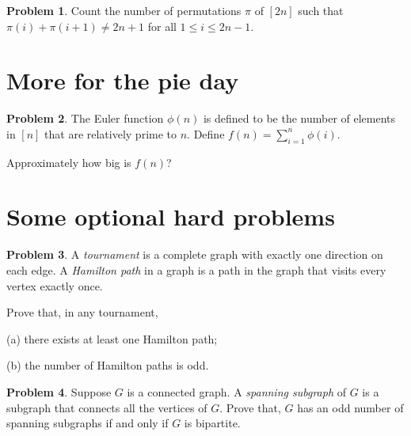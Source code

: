 \documentclass[12pt]{article}
\theoremstyle{definition}
\newtheorem{hw}{Problem}
\begin{document}
\begin{hw}
Count the number of permutations $\pi$ of $[2n]$ such that $\pi(i)+ \pi(i+1) \neq 2n+1$ for all $1 \leq i \leq 2n-1$.
\end{hw}

\section{More for the pie day}

\begin{hw}
The Euler function $\phi(n)$ is defined to be the number of elements
in $[n]$ that are relatively prime to $n$. Define $f(n)= \sum_{i=1}^n
\phi(i)$.

Approximately how big is $f(n)$?
\end{hw}

\section{Some optional hard problems}

\begin{hw}
A {\em tournament} is a complete graph with exactly one direction on
each edge.
A {\em Hamilton path} in a graph is a path in the graph that visits
every vertex exactly once.

Prove that, in any tournament,

(a) there exists at least one Hamilton path;

(b) the number of Hamilton paths is odd.

\end{hw}

\begin{hw}
Suppose $G$ is a connected graph. A {\em spanning subgraph} of $G$ is
a subgraph that connects all the vertices of $G$. Prove that,
$G$ has an odd number of spanning subgraphs if and only if
$G$ is bipartite.
\end{hw}
\end{document}
